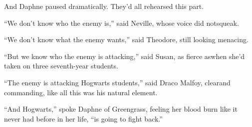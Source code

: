 And Daphne paused dramatically. They'd all rehearsed this part.

``We don't know who the enemy is,'' said Neville, whose voice did notsqueak.

``We don't know what the enemy wants,'' said Theodore, still looking menacing.

``But we know who the enemy is attacking,'' said Susan, as fierce aswhen she'd taken on three seventh-year students.

``The enemy is attacking Hogwarts students,'' said Draco Malfoy, clearand commanding, like all this was his natural element.

``And Hogwarts,'' spoke Daphne of Greengrass, feeling her blood burn like it never had before in her life, ``is going to fight back.''
